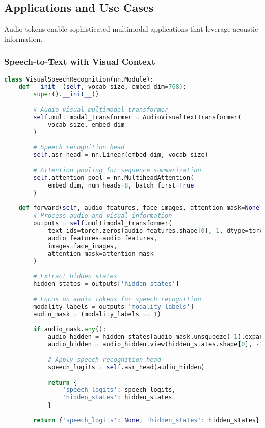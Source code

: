 \subsection{Applications and Use Cases}

Audio tokens enable sophisticated multimodal applications that leverage acoustic information.

\subsubsection{Speech-to-Text with Visual Context}

\begin{lstlisting}[language=Python, caption=Visual speech recognition with audio tokens]
class VisualSpeechRecognition(nn.Module):
    def __init__(self, vocab_size, embed_dim=768):
        super().__init__()
        
        # Audio-visual multimodal transformer
        self.multimodal_transformer = AudioVisualTextTransformer(
            vocab_size, embed_dim
        )
        
        # Speech recognition head
        self.asr_head = nn.Linear(embed_dim, vocab_size)
        
        # Attention pooling for sequence summarization
        self.attention_pool = nn.MultiheadAttention(
            embed_dim, num_heads=8, batch_first=True
        )
        
    def forward(self, audio_features, face_images, attention_mask=None):
        # Process audio and visual information
        outputs = self.multimodal_transformer(
            text_ids=torch.zeros(audio_features.shape[0], 1, dtype=torch.long),
            audio_features=audio_features,
            images=face_images,
            attention_mask=attention_mask
        )
        
        # Extract hidden states
        hidden_states = outputs['hidden_states']
        
        # Focus on audio tokens for speech recognition
        modality_labels = outputs['modality_labels']
        audio_mask = (modality_labels == 1)
        
        if audio_mask.any():
            audio_hidden = hidden_states[audio_mask.unsqueeze(-1).expand_as(hidden_states)]
            audio_hidden = audio_hidden.view(hidden_states.shape[0], -1, hidden_states.shape[-1])
            
            # Apply speech recognition head
            speech_logits = self.asr_head(audio_hidden)
            
            return {
                'speech_logits': speech_logits,
                'hidden_states': hidden_states
            }
        
        return {'speech_logits': None, 'hidden_states': hidden_states}
\end{lstlisting}

